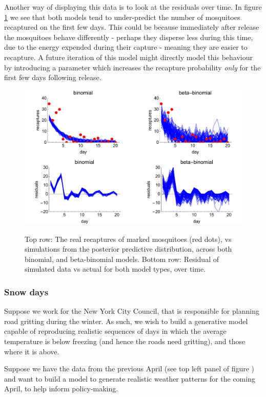 \documentclass[11pt,fullpage]{book}
\begin{document}
Another way of displaying this data is to look at the residuals over time. In figure \ref{fig:Evaluation_mosquitoPPC} we see that both models tend to under-predict the number of mosquitoes recaptured on the first few days. This could be because immediately after release the mosquitoes behave differently - perhaps they disperse less during this time, due to the energy expended during their capture - meaning they are easier to recapture. A future iteration of this model might directly model this behaviour by introducing a parameter which increases the recapture probability \textit{only} for the first few days following release.

\begin{figure}
\centering
\scalebox{0.5} 
{\includegraphics{Evaluation_mosquitoPPC.pdf}}
\caption{Top row: The real recaptures of marked mosquitoes (red dots), vs simulations from the posterior predictive distribution, across both binomial, and beta-binomial models. Bottom row: Residual of simulated data vs actual for both model types, over time.}\label{fig:Evaluation_mosquitoPPC}
\end{figure}


\subsubsection{Snow days}
Suppose we work for the New York City Council, that is responsible for planning road gritting during the winter. As such, we wish to build a generative model capable of reproducing realistic sequences of days in which the average temperature is below freezing (and hence the roads need gritting), and those where it is above.

Suppose we have the data from the previous April (see top left panel of figure ) and want to build a model to generate realistic weather patterns for the coming April, to help inform policy-making. 
\end{document}
